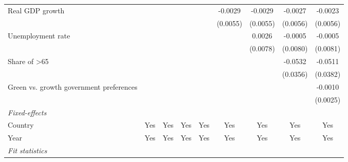 \begin{table}[htbp]
\begin{tabular}{lcccccccc}
      Real GDP growth                                                          &          &          &                &                 & -0.0029         & -0.0029         & -0.0027         & -0.0023\\   
                                                                               &          &          &                &                 & (0.0055)        & (0.0055)        & (0.0056)        & (0.0056)\\   
      Unemployment rate                                                        &          &          &                &                 &                 & 0.0026          & -0.0005         & -0.0005\\   
                                                                               &          &          &                &                 &                 & (0.0078)        & (0.0080)        & (0.0081)\\   
      Share of >65                                                             &          &          &                &                 &                 &                 & -0.0532         & -0.0511\\   
                                                                               &          &          &                &                 &                 &                 & (0.0356)        & (0.0382)\\   
      Green vs. growth government preferences                                  &          &          &                &                 &                 &                 &                 & -0.0010\\   
                                                                               &          &          &                &                 &                 &                 &                 & (0.0025)\\   
      \midrule
      \emph{Fixed-effects}\\
      Country                                                                  & Yes      & Yes      & Yes            & Yes             & Yes             & Yes             & Yes             & Yes\\  
      Year                                                                     & Yes      & Yes      & Yes            & Yes             & Yes             & Yes             & Yes             & Yes\\  
      \midrule
      \emph{Fit statistics}\\

\end{tabular}
\end{table}
